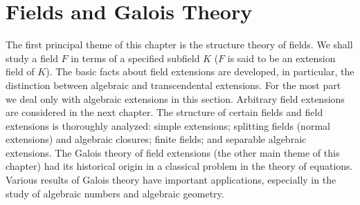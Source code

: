 \section{Fields and Galois Theory}
The first principal theme of this chapter is the structure theory of fields. We shall 
study a field $F$ in terms of a specified subfield $K$ ($F$ is said to be an extension field of $K$). The basic facts about field extensions are developed, in particular, the distinction between algebraic and transcendental extensions. For the most part we deal only with algebraic extensions in this section. Arbitrary field extensions are considered in the next chapter. The structure of certain fields and field extensions is thoroughly analyzed: simple extensions; splitting fields (normal extensions) and algebraic closures; finite fields; and separable algebraic extensions. 
The Galois theory of field extensions (the other main theme of this chapter) had its historical origin in a classical problem in the theory of equations. Various results of Galois theory have important applications, especially in the study of algebraic numbers and algebraic geometry.
